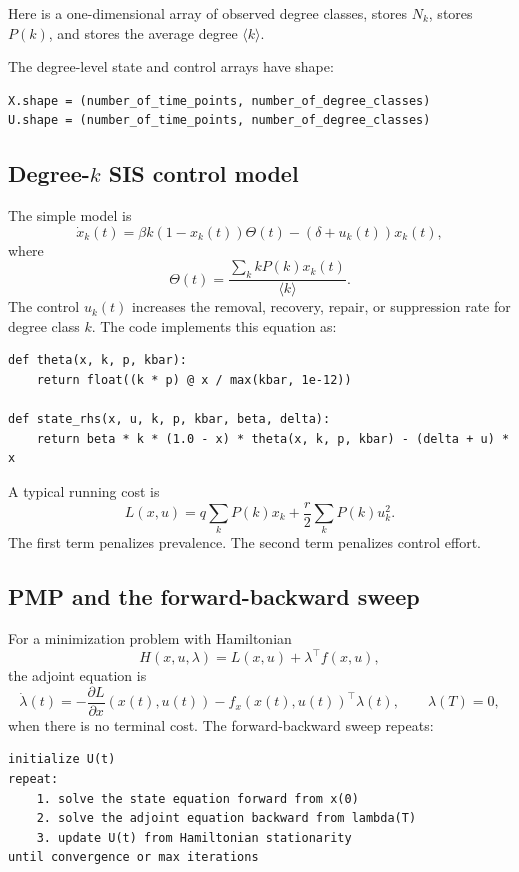 \documentclass[11pt,a4paper]{article}
\DeclareRobustCommand{\code}[1]{\texttt{\detokenize{#1}}}
\begin{document}
Here \code{k} is a one-dimensional array of observed degree classes, \code{counts} stores \(N_k\), \code{p} stores \(P(k)\), and \code{kbar} stores the average degree \(\langle k\rangle\).

The degree-level state and control arrays have shape:

\begin{lstlisting}[style=text]
X.shape = (number_of_time_points, number_of_degree_classes)
U.shape = (number_of_time_points, number_of_degree_classes)
\end{lstlisting}

\subsection{Degree-\(k\) SIS control model}

The simple model is
\[
  \dot{x}_k(t)
  =\beta k(1-x_k(t))\Theta(t)
  -(\delta+u_k(t))x_k(t),
\]
where
\[
  \Theta(t)=\frac{\sum_k kP(k)x_k(t)}{\langle k\rangle}.
\]
The control \(u_k(t)\) increases the removal, recovery, repair, or suppression rate for degree class \(k\). The code implements this equation as:

\begin{lstlisting}[style=py]
def theta(x, k, p, kbar):
    return float((k * p) @ x / max(kbar, 1e-12))

def state_rhs(x, u, k, p, kbar, beta, delta):
    return beta * k * (1.0 - x) * theta(x, k, p, kbar) - (delta + u) * x
\end{lstlisting}

A typical running cost is
\[
  L(x,u)=q\sum_k P(k)x_k+\frac{r}{2}\sum_kP(k)u_k^2.
\]
The first term penalizes prevalence. The second term penalizes control effort.

\subsection{PMP and the forward-backward sweep}

For a minimization problem with Hamiltonian
\[
  H(x,u,\lambda)=L(x,u)+\lambda^\top f(x,u),
\]
the adjoint equation is
\[
  \dot{\lambda}(t)
  =-\frac{\partial L}{\partial x}(x(t),u(t))
   -f_x(x(t),u(t))^\top\lambda(t),
  \qquad
  \lambda(T)=0,
\]
when there is no terminal cost. The forward-backward sweep repeats:

\begin{lstlisting}[style=text]
initialize U(t)
repeat:
    1. solve the state equation forward from x(0)
    2. solve the adjoint equation backward from lambda(T)
    3. update U(t) from Hamiltonian stationarity
until convergence or max iterations
\end{lstlisting}
\end{document}
